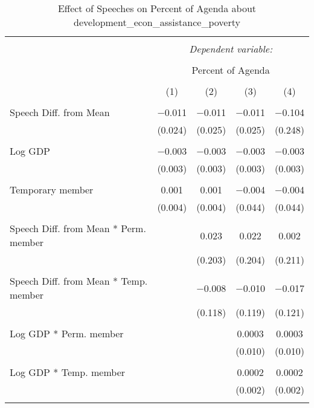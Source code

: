 
\begin{table}[!htbp] \centering 
  \caption{Effect of Speeches on Percent of Agenda about development_econ_assistance_poverty} 
  \label{} 
\begin{tabular}{@{\extracolsep{5pt}}lcccc} 
\\[-1.8ex]\hline 
\hline \\[-1.8ex] 
 & \multicolumn{4}{c}{\textit{Dependent variable:}} \\ 
\cline{2-5} 
\\[-1.8ex] & \multicolumn{4}{c}{Percent of Agenda} \\ 
\\[-1.8ex] & (1) & (2) & (3) & (4)\\ 
\hline \\[-1.8ex] 
 Speech Diff. from Mean & $-$0.011 & $-$0.011 & $-$0.011 & $-$0.104 \\ 
  & (0.024) & (0.025) & (0.025) & (0.248) \\ 
  & & & & \\ 
 Log GDP & $-$0.003 & $-$0.003 & $-$0.003 & $-$0.003 \\ 
  & (0.003) & (0.003) & (0.003) & (0.003) \\ 
  & & & & \\ 
 Temporary member & 0.001 & 0.001 & $-$0.004 & $-$0.004 \\ 
  & (0.004) & (0.004) & (0.044) & (0.044) \\ 
  & & & & \\ 
 Speech Diff. from Mean * Perm. member &  & 0.023 & 0.022 & 0.002 \\ 
  &  & (0.203) & (0.204) & (0.211) \\ 
  & & & & \\ 
 Speech Diff. from Mean * Temp. member &  & $-$0.008 & $-$0.010 & $-$0.017 \\ 
  &  & (0.118) & (0.119) & (0.121) \\ 
  & & & & \\ 
 Log GDP * Perm. member &  &  & 0.0003 & 0.0003 \\ 
  &  &  & (0.010) & (0.010) \\ 
  & & & & \\ 
 Log GDP * Temp. member &  &  & 0.0002 & 0.0002 \\ 
  &  &  & (0.002) & (0.002) \\ 
  & & & & \\ 

\end{tabular}
\end{table}
